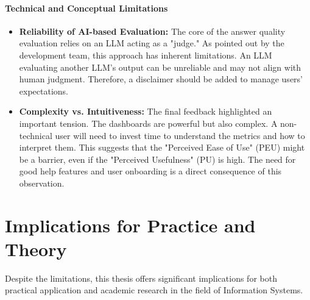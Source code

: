 \documentclass[
	english,
	ruledheaders=section,%
	class=report,%
	thesis={type=bachelor},%
	accentcolor=1b,%
	custommargins=true,%
	marginpar=false,%
	parskip=half-,%
	fontsize=11pt,%
	DIV=14,
]{tudapub}
\begin{document}
\paragraph{Technical and Conceptual Limitations}
\begin{itemize}
    \item \textbf{Reliability of AI-based Evaluation:} The core of the answer quality evaluation relies on an LLM acting as a "judge." As pointed out by the development team, this approach has inherent limitations. An LLM evaluating another LLM's output can be unreliable and may not align with human judgment. Therefore, a disclaimer should be added to manage users' expectations.
    \item \textbf{Complexity vs. Intuitiveness:} The final feedback highlighted an important tension. The dashboards are powerful but also complex. A non-technical user will need to invest time to understand the metrics and how to interpret them. This suggests that the "Perceived Ease of Use" (PEU) might be a barrier, even if the "Perceived Usefulness" (PU) is high. The need for good help features and user onboarding is a direct consequence of this observation.
\end{itemize}

\section{Implications for Practice and Theory}
Despite the limitations, this thesis offers significant implications for both practical application and academic research in the field of Information Systems.
\end{document}

